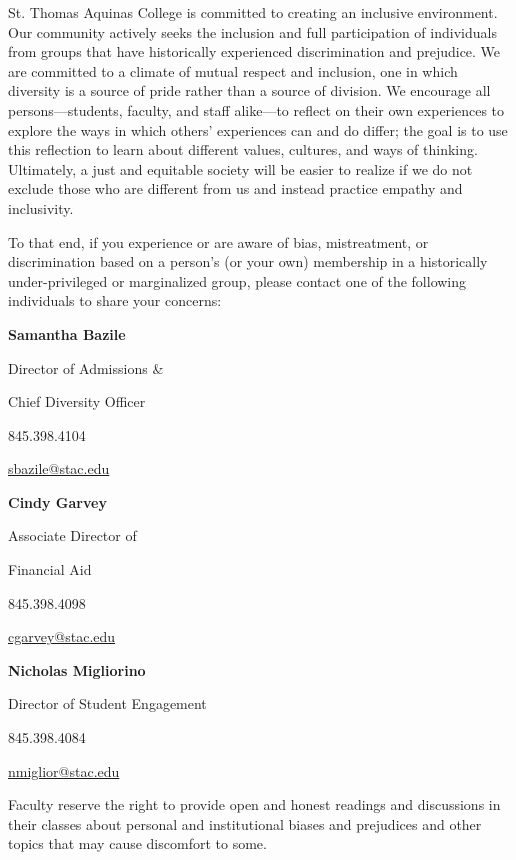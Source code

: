 \documentclass[11pt,letterpaper]{article}
\begin{document}
St. Thomas Aquinas College is committed to creating an inclusive environment. Our community actively seeks the inclusion and full participation of individuals from groups that have historically experienced discrimination and prejudice. We are committed to a climate of mutual respect and inclusion, one in which diversity is a source of pride rather than a source of division. We encourage all persons---students, faculty, and staff alike---to reflect on their own experiences to explore the ways in which others' experiences can and do differ; the goal is to use this reflection to learn about different values, cultures, and ways of thinking. Ultimately, a just and equitable society will be easier to realize if we do not exclude those who are different from us and instead practice empathy and inclusivity. \pspace 

To that end, if you experience or are aware of bias, mistreatment, or discrimination based on a person's (or your own) membership in a historically under-privileged or marginalized group, please contact one of the following individuals to share your concerns: \pspace

	\hfill\begin{minipage}[t]{0.33\textwidth}
	{\bfseries Samantha Bazile} \par
	Director of Admissions \& \par
	Chief Diversity Officer \par
	845.398.4104 \par
	\href{mailto:sbazile@stac.edu}{sbazile@stac.edu}
	 \end{minipage}\begin{minipage}[t]{0.33\textwidth}
	{\bfseries Cindy Garvey} \par
	Associate Director of \par
	Financial Aid \par
	845.398.4098 \par
	\href{mailto:cgarvey@stac.edu}{cgarvey@stac.edu}
	\end{minipage} 
	\hfill\begin{minipage}[t]{0.33\textwidth}
	{\bfseries Nicholas Migliorino} \par
	Director of Student Engagement \par
	845.398.4084 \par
	\href{mailto:nmiglior@stac.edu}{nmiglior@stac.edu}
	\end{minipage}\hfill \pspace

Faculty reserve the right to provide open and honest readings and discussions in their classes about personal and institutional biases and prejudices and other topics that may cause discomfort to some. \pspace
\end{document}
